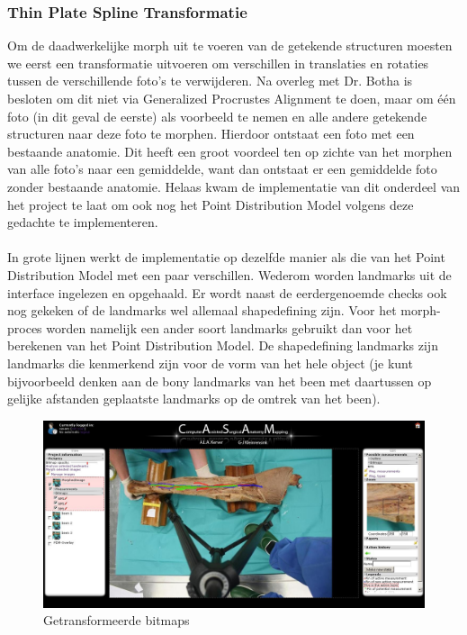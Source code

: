 \subsubsection{Thin Plate Spline Transformatie}
Om de daadwerkelijke morph uit te voeren van de getekende structuren moesten we eerst een transformatie uitvoeren om verschillen in translaties en rotaties tussen de verschillende foto's te verwijderen. 
Na overleg met Dr. Botha is besloten om dit niet via Generalized Procrustes Alignment te doen, maar om \'{e}\'{e}n foto (in dit geval de eerste) als voorbeeld te nemen en alle andere getekende structuren naar deze foto te morphen. 
Hierdoor ontstaat een foto met een bestaande anatomie. Dit heeft een groot voordeel ten op zichte van het morphen van alle foto's naar een gemiddelde, want dan ontstaat er een gemiddelde foto zonder bestaande anatomie. 
Helaas kwam de implementatie van dit onderdeel van het project te laat om ook nog het Point Distribution Model volgens deze gedachte te implementeren. 
\\
\\
In grote lijnen werkt de implementatie op dezelfde manier als die van het Point Distribution Model met een paar verschillen. 
Wederom worden landmarks uit de interface ingelezen en opgehaald. 
Er wordt naast de eerdergenoemde checks ook nog gekeken of de landmarks wel allemaal shapedefining zijn. 
Voor het morph-proces worden namelijk een ander soort landmarks gebruikt dan voor het berekenen van het Point Distribution Model. 
De shapedefining landmarks zijn landmarks die kenmerkend zijn voor de vorm van het hele object (je kunt bijvoorbeeld denken aan de bony landmarks van het been met daartussen op gelijke afstanden geplaatste landmarks op de omtrek van het been). 
\\
\begin{figure}[htbp]
\includegraphics[width=\textwidth]{screen3}
\caption{Getransformeerde bitmaps}
\label{fig:screen3}
\end{figure}
